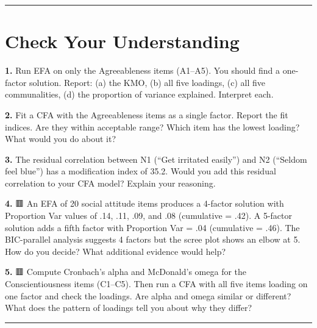 \documentclass[
]{article}
\begin{document}
\begin{center}\rule{0.5\linewidth}{0.5pt}\end{center}

\section{Check Your Understanding}\label{check-your-understanding}

\textbf{1.} Run EFA on only the Agreeableness items (A1--A5). You should
find a one-factor solution. Report: (a) the KMO, (b) all five loadings,
(c) all five communalities, (d) the proportion of variance explained.
Interpret each.

\textbf{2.} Fit a CFA with the Agreeableness items as a single factor.
Report the fit indices. Are they within acceptable range? Which item has
the lowest loading? What would you do about it?

\textbf{3.} The residual correlation between N1 (``Get irritated
easily'') and N2 (``Seldom feel blue'') has a modification index of
35.2. Would you add this residual correlation to your CFA model? Explain
your reasoning.

\textbf{4.} 🟥 An EFA of 20 social attitude items produces a 4-factor
solution with Proportion Var values of .14, .11, .09, and .08
(cumulative = .42). A 5-factor solution adds a fifth factor with
Proportion Var = .04 (cumulative = .46). The BIC-parallel analysis
suggests 4 factors but the scree plot shows an elbow at 5. How do you
decide? What additional evidence would help?

\textbf{5.} 🟥 Compute Cronbach's alpha and McDonald's omega for the
Conscientiousness items (C1--C5). Then run a CFA with all five items
loading on one factor and check the loadings. Are alpha and omega
similar or different? What does the pattern of loadings tell you about
why they differ?

\begin{center}\rule{0.5\linewidth}{0.5pt}\end{center}
\end{document}
